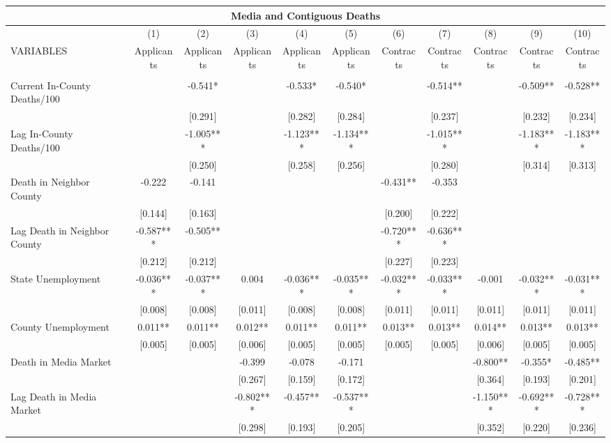 \documentclass[]{article}
\begin{document}
\begin{tabular}{lcccccccccc}
\multicolumn{11}{c}{Media and Contiguous Deaths} \\ \hline
 & (1) & (2) & (3) & (4) & (5) & (6) & (7) & (8) & (9) & (10) \\
VARIABLES & Applicants & Applicants & Applicants & Applicants & Applicants & Contracts & Contracts & Contracts & Contracts & Contracts \\ \hline
 &  &  &  &  &  &  &  &  &  &  \\
Current In-County Deaths/100 &  & -0.541* &  & -0.533* & -0.540* &  & -0.514** &  & -0.509** & -0.528** \\
 &  & [0.291] &  & [0.282] & [0.284] &  & [0.237] &  & [0.232] & [0.234] \\
Lag In-County Deaths/100 &  & -1.005*** &  & -1.123*** & -1.134*** &  & -1.015*** &  & -1.183*** & -1.183*** \\
 &  & [0.250] &  & [0.258] & [0.256] &  & [0.280] &  & [0.314] & [0.313] \\
Death in Neighbor County & -0.222 & -0.141 &  &  &  & -0.431** & -0.353 &  &  &  \\
 & [0.144] & [0.163] &  &  &  & [0.200] & [0.222] &  &  &  \\
Lag Death in Neighbor County & -0.587*** & -0.505** &  &  &  & -0.720*** & -0.636*** &  &  &  \\
 & [0.212] & [0.212] &  &  &  & [0.227] & [0.223] &  &  &  \\
State Unemployment & -0.036*** & -0.037*** & 0.004 & -0.036*** & -0.035*** & -0.032*** & -0.033*** & -0.001 & -0.032*** & -0.031*** \\
 & [0.008] & [0.008] & [0.011] & [0.008] & [0.008] & [0.011] & [0.011] & [0.011] & [0.011] & [0.011] \\
County Unemployment & 0.011** & 0.011** & 0.012** & 0.011** & 0.011** & 0.013** & 0.013** & 0.014** & 0.013** & 0.013** \\
 & [0.005] & [0.005] & [0.006] & [0.005] & [0.005] & [0.005] & [0.005] & [0.006] & [0.005] & [0.005] \\
Death in Media Market &  &  & -0.399 & -0.078 & -0.171 &  &  & -0.800** & -0.355* & -0.485** \\
 &  &  & [0.267] & [0.159] & [0.172] &  &  & [0.364] & [0.193] & [0.201] \\
Lag Death in Media Market &  &  & -0.802*** & -0.457** & -0.537*** &  &  & -1.150*** & -0.692*** & -0.728*** \\
 &  &  & [0.298] & [0.193] & [0.205] &  &  & [0.352] & [0.220] & [0.236] \\

\end{tabular}
\end{document}
